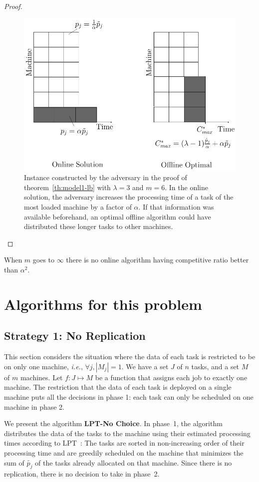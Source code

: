 \documentclass[twocolumn]{svjour3}
\begin{document}
\begin{proof}
  \begin{figure}[htp]
  \centering
  \includegraphics[width= 8 cm]{model1.pdf}
  \caption{Instance constructed by the adversary in the proof of
    theorem~\ref{th:model1-lb} with $\lambda = 3$ and $m = 6$. In the
    online solution, the adversary increases 
    the processing time of a task of the most loaded machine by a factor of $\alpha$. If
    that information was available beforehand, an optimal offline
    algorithm could have distributed these longer tasks to other
    machines.}
  \label{fig:rara}
  \end{figure}
\end{proof}    
  
  
  \begin{corollary}
  When $m$ goes to $\infty$ there is no online algorithm having competitive ratio better than $\alpha^{2}$.
  \end{corollary}


\section{Algorithms for this problem}

\subsection{Strategy 1: No Replication}\label{sec4}


This section considers the situation where the data of each task is
restricted to be on only one machine, {\em i.e.}, $\forall j, |M_j|=1$.  We
have a set $J$ of $n$ tasks, and a set $M$ of $m$ machines.  Let $f :
J \mapsto M$ be a function that assigns each job to exactly one
machine. The restriction that the data of each task is deployed on a
single machine puts all the decisions in phase 1: each task can only be
scheduled on one machine in phase 2.


We present the algorithm \textbf{LPT-No Choice}. In phase~1, the
algorithm distributes the data of the tasks to the machine using
their estimated processing times according to 
LPT~\cite{Graham69boundson}: The tasks are sorted in non-increasing
order of their processing time and are greedily scheduled on the
machine that minimizes the sum of $\tilde{p_j}$ of the tasks
already allocated on that machine. Since there is no replication, there is
no decision to take in phase~2.
\end{document}
